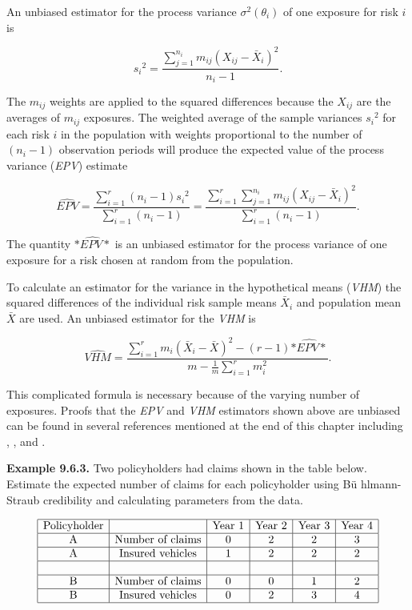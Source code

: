 \documentclass[]{book}
\theoremstyle{definition}
\theoremstyle{definition}
\theoremstyle{definition}
\theoremstyle{remark}
\begin{document}
An unbiased estimator for the process variance \(\sigma^2(\theta_i)\) of
one exposure for risk \(i\) is

\begin{equation*}  
{s_i}^2=\frac{\sum_{j=1}^{n_i} m_{ij}(X_{ij}-\bar{X}_i)^2}{n_i-1}. \end{equation*}

The \(m_{ij}\) weights are applied to the squared differences because
the \(X_{ij}\) are the averages of \(m_{ij}\) exposures. The weighted
average of the sample variances \({s_i}^2\) for each risk \(i\) in the
population with weights proportional to the number of \((n_i-1)\)
observation periods will produce the expected value of the process
variance (\emph{EPV}) estimate

\begin{equation*}  
\widehat{EPV}=\frac{\sum_{i=1}^r  (n_i-1){s_i}^2}{\sum_{i=1}^r (n_i-1)}=\frac{\sum_{i=1}^r \sum_{j=1}^{n_i} m_{ij}(X_{ij}-\bar{X}_i)^2}{\sum_{i=1}^r (n_i-1)}.     
\end{equation*}

The quantity \(\widehat{*EPV*}\) is an unbiased estimator for the
process variance of one exposure for a risk chosen at random from the
population.

To calculate an estimator for the variance in the hypothetical means
(\emph{VHM}) the squared differences of the individual risk sample means
\(\bar{X}_i\) and population mean \(\bar{X}\) are used. An unbiased
estimator for the \emph{VHM} is

\begin{equation*}  
\widehat{VHM}=\frac{\sum_{i=1}^r m_i(\bar{X}_i-\bar{X})^2 - (r-1)\widehat{*EPV*}}{m-\frac{1}{m}\sum_{i=1}^r m_i^2}.  
\end{equation*}

This complicated formula is necessary because of the varying number of
exposures. Proofs that the \emph{EPV} and \emph{VHM} estimators shown
above are unbiased can be found in several references mentioned at the
end of this chapter including \citep{buhlmanngisler},
\citep{klugman2012}, and \citep{tse}.

\textbf{Example 9.6.3.} Two policyholders had claims shown in the table
below. Estimate the expected number of claims for each policyholder
using Bü hlmann-Straub credibility and calculating parameters from the
data.

\[\begin{matrix}
\begin{array}{|c|c|c|c|c|c|}
\hline
\text{Policyholder} &  & \text{Year 1} & \text{Year 2} & \text{Year 3} & \text{Year 4} \\
\hline
\text{A} & \text{Number of claims} & 0 & 2 & 2 & 3 \\
\hline
\text{A} & \text{Insured vehicles} &  1 & 2 & 2 & 2\\  
\hline
 & & & & & \\
\hline
\text{B} & \text{Number of claims} & 0 & 0 & 1 & 2\\    
\hline 
\text{B} & \text{Insured vehicles} &  0 & 2 & 3 & 4\\      
\hline
\end{array}
\end{matrix}\]
\end{document}
